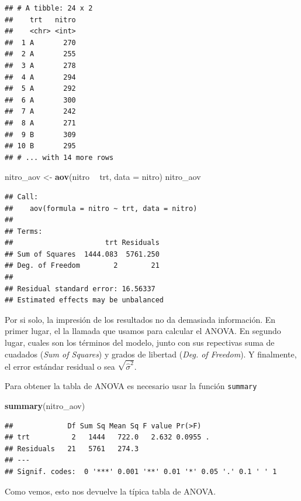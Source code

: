 \documentclass[]{book}
\newenvironment{Shaded}{\begin{snugshade}}{\end{snugshade}}
\newcommand{\DataTypeTok}[1]{\textcolor[rgb]{0.13,0.29,0.53}{#1}}
\newcommand{\KeywordTok}[1]{\textcolor[rgb]{0.13,0.29,0.53}{\textbf{#1}}}
\newcommand{\NormalTok}[1]{#1}
\newcommand{\OperatorTok}[1]{\textcolor[rgb]{0.81,0.36,0.00}{\textbf{#1}}}
\newcommand{\StringTok}[1]{\textcolor[rgb]{0.31,0.60,0.02}{#1}}
\theoremstyle{definition}
\theoremstyle{definition}
\theoremstyle{definition}
\theoremstyle{remark}
\begin{document}
\begin{verbatim}
## # A tibble: 24 x 2
##    trt   nitro
##    <chr> <int>
##  1 A       270
##  2 A       255
##  3 A       278
##  4 A       294
##  5 A       292
##  6 A       300
##  7 A       242
##  8 A       271
##  9 B       309
## 10 B       295
## # ... with 14 more rows
\end{verbatim}

\begin{Shaded}
\begin{Highlighting}[]
\NormalTok{nitro_aov <-}\StringTok{ }\KeywordTok{aov}\NormalTok{(nitro }\OperatorTok{~}\StringTok{ }\NormalTok{trt, }\DataTypeTok{data =}\NormalTok{ nitro)}
\NormalTok{nitro_aov}
\end{Highlighting}
\end{Shaded}

\begin{verbatim}
## Call:
##    aov(formula = nitro ~ trt, data = nitro)
## 
## Terms:
##                      trt Residuals
## Sum of Squares  1444.083  5761.250
## Deg. of Freedom        2        21
## 
## Residual standard error: 16.56337
## Estimated effects may be unbalanced
\end{verbatim}

Por si solo, la impresión de los resultados no da demasiada información.
En primer lugar, el la llamada que usamos para calcular el ANOVA. En
segundo lugar, cuales son los términos del modelo, junto con sus
repectivas suma de cuadados (\emph{Sum of Squares}) y grados de libertad
(\emph{Deg. of Freedom}). Y finalmente, el error estándar residual o sea
\(\sqrt{\hat\sigma^2}\).

Para obtener la tabla de ANOVA es necesario usar la función
\texttt{summary}

\begin{Shaded}
\begin{Highlighting}[]
\KeywordTok{summary}\NormalTok{(nitro_aov)}
\end{Highlighting}
\end{Shaded}

\begin{verbatim}
##             Df Sum Sq Mean Sq F value Pr(>F)  
## trt          2   1444   722.0   2.632 0.0955 .
## Residuals   21   5761   274.3                 
## ---
## Signif. codes:  0 '***' 0.001 '**' 0.01 '*' 0.05 '.' 0.1 ' ' 1
\end{verbatim}

Como vemos, esto nos devuelve la típica tabla de ANOVA.
\end{document}
